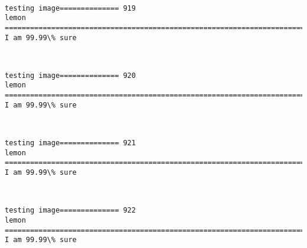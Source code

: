\documentclass[11pt]{article}
\begin{document}
    \begin{center}
    \end{center}
    { \hspace*{\fill} \\}
    
    \begin{Verbatim}[commandchars=\\\{\}]
testing image============== 919
lemon
============================================================================
I am 99.99\% sure

    \end{Verbatim}

    \begin{center}
    \end{center}
    { \hspace*{\fill} \\}
    
    \begin{Verbatim}[commandchars=\\\{\}]
testing image============== 920
lemon
============================================================================
I am 99.99\% sure

    \end{Verbatim}

    \begin{center}
    \end{center}
    { \hspace*{\fill} \\}
    
    \begin{Verbatim}[commandchars=\\\{\}]
testing image============== 921
lemon
============================================================================
I am 99.99\% sure

    \end{Verbatim}

    \begin{center}
    \end{center}
    { \hspace*{\fill} \\}
    
    \begin{Verbatim}[commandchars=\\\{\}]
testing image============== 922
lemon
============================================================================
I am 99.99\% sure

    \end{Verbatim}
\end{document}
